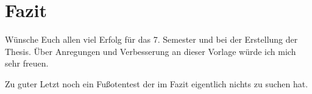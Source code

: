 \section{Fazit}
Wünsche Euch allen viel Erfolg für das 7. Semester und bei der Erstellung der Thesis. Über Anregungen und Verbesserung
an dieser Vorlage würde ich mich sehr freuen.

Zu guter Letzt noch ein Fußotentest der im Fazit eigentlich nichts zu suchen hat.
\textcite{Balzert.2008}
